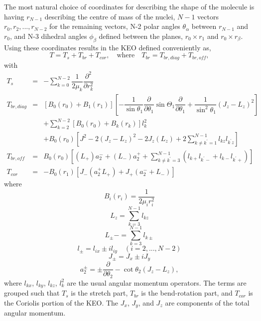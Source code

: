 The most natural choice of coordinates for describing the shape of the molecule is having $r_{N-1}$ describing the centre of mass of the nuclei, $N-1$ vectors $r_0,r_2,...,r _{N-2}$ for the remaining vectors, N-2 polar angles $\theta _{\alpha}$ between $r_{N-1}$ and $r_0$, and N-3 dihedral angles $\phi _{\beta}$ defined between the planes, $r_0 \times r_1$ and $r_0 \times r_{\beta}$.  Using these coordinates results in the KEO defined conveniently as,
\begin{equation}\label{eq.b13}
T=T_s+T_{br}+T_{cor}, \quad \mbox{where}\quad T_{br}=T_{br,diag}+T_{br,off},
\end{equation}
with
\begin{eqnarray}\label{eq.b14}
T_s &=& -\sum_{k=0}^{N-2}\dfrac{1}{2\mu _k} \dfrac{\partial ^2}{\partial r_k^2} \nonumber \\
T_{br,diag} &=& \left[B_0\left(r_0\right)+B_1\left(r_1\right)\right] \left[-\dfrac{1}{\sin \theta_1} 
\dfrac{\partial}{\partial \theta_1} \sin \Theta_1 \dfrac{\partial}{\partial \theta_1}+\dfrac{1}{\sin ^2 \theta_1}
\left( J_{z}-L_{z}\right)^2 \right] \nonumber \\
&&+\sum_{k=2}^{N-2}\left[B_0\left(r_0\right)+B_k\left(r_k\right)\right]l^2_k \nonumber \\
&&+B_0\left(r_0\right)\left[J^2-2\left(J_z-L_z\right)^2-2J_z\left(L_z\right) +2\sum_{k\neq k^{\prime}=1}^{N-1}l_{kz}l_{k^{\prime}z}\right] \nonumber \\
T_{br,off}&=&B_0\left(r_0\right)\left[\left(L_+\right)a_2^- + \left(L_-\right)a_2^+ +\sum_{k\neq k^{\prime}=3}^{N-1}\left(l_{k+}l_{k^{\prime}-}+ l_{k-}l_{k^{\prime}+}\right)\right] \nonumber \\
T_{cor}&=& -B_0\left(r_1\right)\left[J_-\left(a_2^+L_+\right)+J_+\left(a_2^-+L_-\right)\right]
\end{eqnarray}
where
\begin{equation}\label{eq.b15}
B_i\left(r_i\right)=\dfrac{1}{2\mu _i r_i^2}
\end{equation}
\begin{equation}\label{eq.b16}
L_z=\sum_{k=3}^{N-1}l_{kz}
\end{equation}
\begin{equation}\label{eq.b17}
L_{\pm}-=\sum_{k=3}^{N-1}l_{k \pm}
\end{equation}
\begin{equation}\label{eq.b19}
l_{\pm}=l_{ix}\pm i l_{iy} \quad \left(i=2,...,N-2\right)
\end{equation}\label{eq.b20}
\begin{equation}\label{eq.b21}
J_{\pm}=J_x \pm i J_y
\end{equation}
\begin{equation}\label{eq.b22}
a_2^{\pm}=\pm \dfrac{\partial}{\partial \theta_2}-\cot \theta_2 \left(J_z-L_z\right),
\end{equation}
where $l_{kx}$, $l_{ky}$, $l_{kz}$, $l_{k}^2$ are the usual angular momentum operators.  The terms are grouped such that $T_s$ is the stretch part, $T_{br}$ is the bend-rotation part, and $T_{cor}$ is the Coriolis  portion of the KEO.  The $J_x$, $J_y$, and $J_z$ are components of the total angular momentum.

